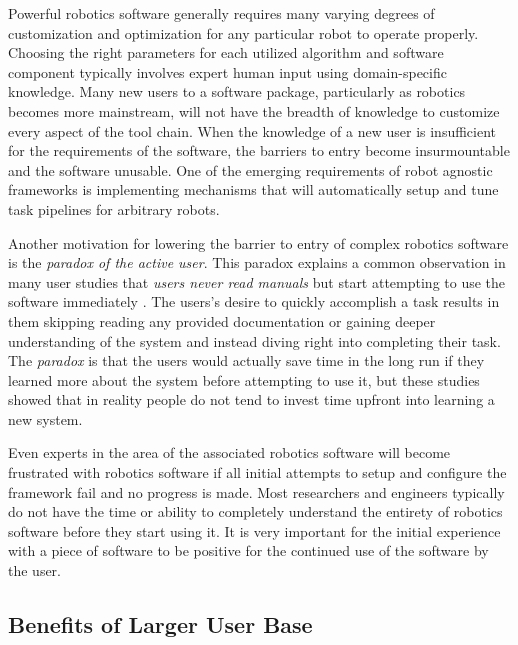 \documentclass[10pt,journal,compsoc]{joser1}
\begin{document}
{Powerful robotics software generally requires many varying degrees of customization and optimization for any particular robot to operate properly. Choosing the right parameters for each utilized algorithm and software component typically involves expert human input using domain-specific knowledge. Many new users to a software package, particularly as robotics becomes more mainstream, will not have the breadth of knowledge to customize every aspect of the tool chain. When the knowledge of a new user is insufficient for the requirements of the software, the barriers to entry become insurmountable and the software unusable. One of the emerging requirements of robot agnostic frameworks is implementing mechanisms that will automatically setup and tune task pipelines for arbitrary robots.

Another motivation for lowering the barrier to entry of complex robotics software is the \textit{paradox of the active user}. This paradox explains a common observation in many user studies that \textit{users never read manuals} but start attempting to use the software immediately \cite{carroll1987interfacing}. The users's desire to quickly accomplish a task results in them skipping reading any provided documentation or gaining deeper understanding of the system and instead diving right into completing their task. The \textit{paradox} is that the users would actually save time in the long run if they learned more about the system before attempting to use it, but these studies showed that in reality people do not tend to invest time upfront into learning a new system.

Even experts in the area of the associated robotics software will become frustrated with robotics software if all initial attempts to setup and configure the framework fail and no progress is made. Most researchers and engineers typically do not have the time or ability to completely understand the entirety of robotics software before they start using it. It is very important for the initial experience with a piece of software to be positive for the continued use of the software by the user.

\subsection{Benefits of Larger User Base}

}
\end{document}
